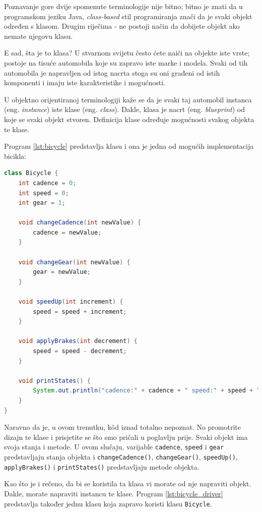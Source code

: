 Poznavanje gore dvije spomenute terminologije nije bitno; bitno je znati da u programskom jeziku Java, \emph{class-based} stil programiranja znači da je svaki objekt određen s klasom. Drugim riječima - ne postoji način da dobijete objekt ako nemate njegovu klasu.

E sad, šta je to klasa? U stvarnom svijetu često ćete naići na objekte iste vrste; postoje na tisuće automobila koje su zapravo iste marke i modela. Svaki od tih automobila je napravljen od istog nacrta stoga su oni građeni od istih komponenti i imaju iste karakteristike i mogućnosti.

U objektno orijentiranoj terminologiji kaže se da je svaki taj automobil instanca (eng. \emph{instance}) iste klase (eng. \emph{class}). Dakle, klasa je nacrt (eng. \emph{blueprint}) od koje se svaki objekt stvoren. Definicija klase određuje mogućnosti svakog objekta te klase.

Program \ref{lst:bicycle} predstavlja klasu i ona je jedna od mogućih implementacija bicikla:~\cite{javatutorials}

\begin{lstlisting}[language=Java, caption=Bicycle, label=lst:bicycle]
class Bicycle {
    int cadence = 0;
    int speed = 0;
    int gear = 1;
    
    void changeCadence(int newValue) {
        cadence = newValue;
    }
    
    void changeGear(int newValue) {
        gear = newValue;
    }
    
    void speedUp(int increment) {
        speed = speed + increment;
    }
    
    void applyBrakes(int decrement) {
        speed = speed - decrement;
    }
    
    void printStates() {
        System.out.println("cadence:" + cadence + " speed:" + speed + " gear:" + gear);
    }
}
\end{lstlisting}

Naravno da je, u ovom trenutku, kôd iznad totalno nepoznat. No promotrite dizajn te klase i prisjetite se što smo pričali u poglavlju prije. Svaki objekt ima svoja stanja i metode. U ovom slučaju, varijable \texttt{cadence}, \texttt{speed} i \texttt{gear} predstavljaju stanja objekta i \texttt{changeCadence()}, \texttt{changeGear()}, \texttt{speedUp()}, \texttt{applyBrakes()} i \texttt{printStates()} predstavljaju metode objekta.

Kao što je i rečeno, da bi se koristila ta klasa vi morate od nje napraviti objekt. Dakle, morate napraviti instancu te klase. Program \ref{lst:bicycle_driver} predstavlja također jednu klasu koja zapravo koristi klasu \texttt{Bicycle}.~\cite{javatutorials}

